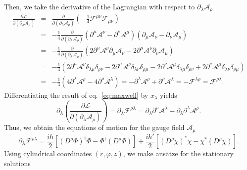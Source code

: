 Then, we take the derivative of the Lagrangian with respect to $\partial_{\lambda}\mathcal{A}_{\rho}$ 
\begin{eqnarray}
	\label{eq:maxwell}
	\frac{\partial \mathcal{L}}{\partial (\partial_{\lambda}\mathcal{A}_{\rho})} & = & \frac{\partial}{\partial (\partial_{\lambda}\mathcal{A}_{\rho})}\left(-\frac{1}{4}\mathcal{F}^{\mu\nu}\mathcal{F}_{\mu\nu}\right) \nonumber\\
	& = & -\frac{1}{4}\frac{\partial}{\partial (\partial_{\lambda}\mathcal{A}_{\rho})}\left(\partial^{\mu}\mathcal{A}^{\nu}-\partial^{\nu}\mathcal{A}^{\mu}\right)\left(\partial_{\mu}\mathcal{A}_{\nu}-\partial_{\nu}\mathcal{A}_{\mu}\right) \nonumber\\
	& = & -\frac{1}{4}\frac{\partial}{\partial (\partial_{\lambda}\mathcal{A}_{\rho})}(2\partial^{\mu}\mathcal{A}^{\nu}\partial_{\mu}\mathcal{A}_{\nu}-2\partial^{\mu}\mathcal{A}^{\nu}\partial_{\nu}\mathcal{A}_{\mu}) \nonumber\\
	& = & -\frac{1}{4}\left(2\partial^{\mu}\mathcal{A}^{\nu}\delta_{\lambda\mu}\delta_{\rho\nu}-2\partial^{\mu}\mathcal{A}^{\nu}\delta_{\lambda\nu}\delta_{\rho\mu}-2\partial^{\nu}\mathcal{A}^{\mu} \delta_{\lambda\mu}\delta_{\rho\nu}+2\partial^{\nu}\mathcal{A}^{\mu}\delta_{\lambda\nu}\delta_{\rho\mu}\right) \nonumber\\
	& = & -\frac{1}{4}(4\partial^{\lambda}\mathcal{A}^{\rho}-4\partial^{\rho}\mathcal{A}^{\lambda}) = -\partial^{\lambda}\mathcal{A}^{\rho}+\partial^{\rho}\mathcal{A}^{\lambda} = -\mathcal{F}^{\lambda\rho} = \mathcal{F}^{\rho\lambda}.
\end{eqnarray}
Differentiating the result of eq.\ \eqref{eq:maxwell} by $x_{\lambda}$ yields
\begin{equation}
\partial_{\lambda}\left(\frac{\partial \mathcal{L}}{\partial (\partial_{\lambda}\mathcal{A}_{\rho})}\right) = \partial_{\lambda}\mathcal{F}^{\rho\lambda} = \partial_{\lambda}\partial^{\rho}\mathcal{A}^{\lambda}-\partial_{\lambda}\partial^{\lambda}\mathcal{A}^{\rho}.
\end{equation}
Thus, we obtain the equations of motion  for the gauge field $\mathcal{A}_{\mu}$
\begin{equation}
\label{eq:max_eqs}
\partial_{\lambda}\mathcal{F}^{\rho\lambda} = \frac{ih}{2}\left[ (D^{\rho}\Phi)^{\dagger}\Phi-\Phi^{\dagger}(D^{\rho}\Phi)\right] + \frac{ih'}{2}\left[ (D^{\rho}\chi)^{*}\chi-\chi^{*}(D^{\rho}\chi)\right].
\end{equation}
Using cylindrical coordinates $(r,\varphi,z)$, we make ans\"{a}tze for the stationary solutions 
